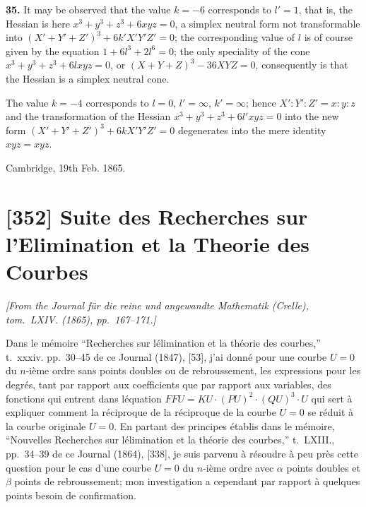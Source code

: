 \documentclass[11pt,a4paper]{article}
\theoremstyle{plain}
\begin{document}
\noindent\textbf{35.} It may be observed that the value $k=-6$ corresponds to $l'=1$, that is, the Hessian is here $x^3+y^3+z^3+6xyz=0$, a simplex neutral form not transformable into $(X'+Y'+Z')^3 + 6k'X'Y'Z' = 0$; the corresponding value of $l$ is of course given by the equation $1+6l^3+2l^6 = 0$; the only speciality of the cone $x^3+y^3+z^3+6lxyz=0$, or $(X+Y+Z)^3 - 36XYZ = 0$, consequently is that the Hessian is a simplex neutral cone.

The value $k=-4$ corresponds to $l=0$, $l'=\infty$, $k'=\infty$; hence $X':Y':Z' = x:y:z$ and the transformation of the Hessian $x^3+y^3+z^3+6l'xyz=0$ into the new form $(X'+Y'+Z')^3 + 6kX'Y'Z' = 0$ degenerates into the mere identity $xyz = xyz$.

\begin{flushright}
Cambridge, 19th Feb. 1865.
\end{flushright}

\newpage
\section*{[352] Suite des Recherches sur l'Elimination et la Theorie des Courbes}

\begin{flushright}
\textit{[From the Journal f\"ur die reine und angewandte Mathematik (Crelle),\\
tom.~LXIV. (1865), pp.~167--171.]}
\end{flushright}

Dans le m\'emoire ``Recherches sur l\'elimination et la th\'eorie des courbes,'' t.~xxxiv. pp.~30--45 de ce Journal (1847), [53], j'ai donn\'e pour une courbe $U=0$ du $n$-i\`eme ordre sans points doubles ou de rebroussement, les expressions pour les degr\'es, tant par rapport aux coefficients que par rapport aux variables, des fonctions qui entrent dans l\'equation $FFU = KU \cdot (PU)^2 \cdot (QU)^3 \cdot U$ qui sert \`a expliquer comment la r\'eciproque de la r\'eciproque de la courbe $U=0$ se r\'eduit \`a la courbe originale $U=0$. En partant des principes \'etablis dans le m\'emoire, ``Nouvelles Recherches sur l\'elimination et la th\'eorie des courbes,'' t.~LXIII., pp.~34--39 de ce Journal (1864), [338], je suis parvenu \`a r\'esoudre \`a peu pr\`es cette question pour le cas d'une courbe $U=0$ du $n$-i\`eme ordre avec $\alpha$ points doubles et $\beta$ points de rebroussement; mon investigation a cependant par rapport \`a quelques points besoin de confirmation.
\end{document}
